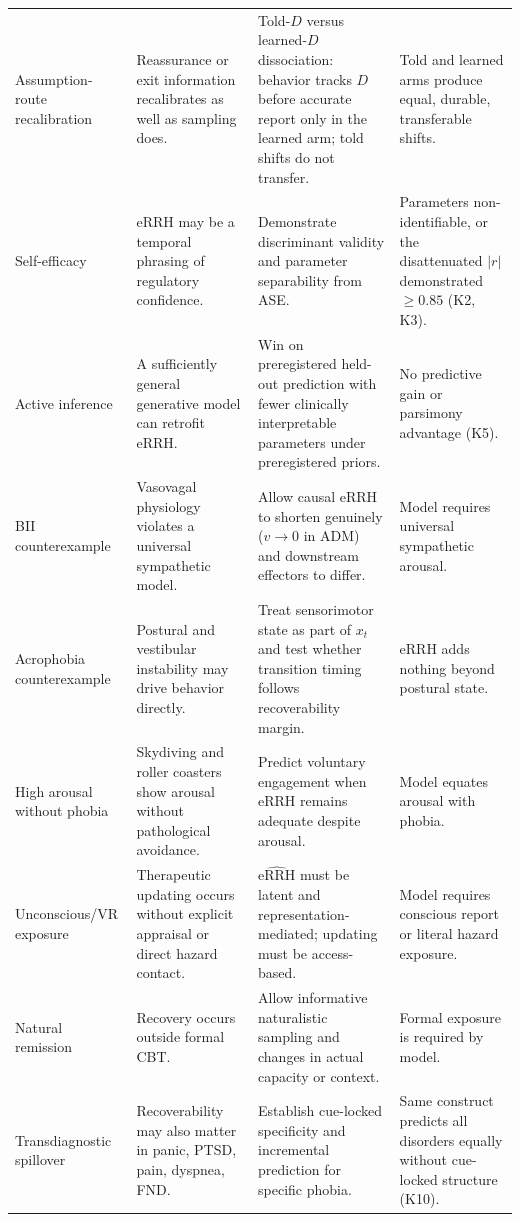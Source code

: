 \documentclass[9pt,twocolumn]{article}
\newcommand{\eRRHhat}{\widehat{\mathrm{eRRH}}}
\begin{document}
\begin{table}[!t]
\begin{tabularx}{\textwidth}{p{}X X p{}}
Assumption-route recalibration & Reassurance or exit information recalibrates as well as sampling does. & Told-$D$ versus learned-$D$ dissociation: behavior tracks $D$ before accurate report only in the learned arm; told shifts do not transfer. & Told and learned arms produce equal, durable, transferable shifts. \\
Self-efficacy & eRRH may be a temporal phrasing of regulatory confidence. & Demonstrate discriminant validity and parameter separability from ASE. & Parameters non-identifiable, or the disattenuated $|r|$ demonstrated $\ge0.85$ (K2, K3). \\
Active inference & A sufficiently general generative model can retrofit eRRH. & Win on preregistered held-out prediction with fewer clinically interpretable parameters under preregistered priors. & No predictive gain or parsimony advantage (K5). \\
BII counterexample & Vasovagal physiology violates a universal sympathetic model. & Allow causal eRRH to shorten genuinely ($v\to0$ in ADM) and downstream effectors to differ. & Model requires universal sympathetic arousal. \\
Acrophobia counterexample & Postural and vestibular instability may drive behavior directly. & Treat sensorimotor state as part of $x_t$ and test whether transition timing follows recoverability margin. & eRRH adds nothing beyond postural state. \\
High arousal without phobia & Skydiving and roller coasters show arousal without pathological avoidance. & Predict voluntary engagement when eRRH remains adequate despite arousal. & Model equates arousal with phobia. \\
Unconscious/VR exposure & Therapeutic updating occurs without explicit appraisal or direct hazard contact. & $\eRRHhat$ must be latent and representation-mediated; updating must be access-based. & Model requires conscious report or literal hazard exposure. \\
Natural remission & Recovery occurs outside formal CBT. & Allow informative naturalistic sampling and changes in actual capacity or context. & Formal exposure is required by model. \\
Transdiagnostic spillover & Recoverability may also matter in panic, PTSD, pain, dyspnea, FND. & Establish cue-locked specificity and incremental prediction for specific phobia. & Same construct predicts all disorders equally without cue-locked structure (K10). \\
\bottomrule
\end{tabularx}
\end{table}
\end{document}
